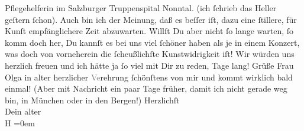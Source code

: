 \begin{ledgroupsized}[t]{13cm}
{{{                  Pflegehelferin im Salzburger Truppenspital
                     Nonntal.}}}\label{K_L02204_1h} (ich ſchrieb das Heller geſtern ſchon). Auch bin ich der Meinung, daß es beſſer iſt, dazu
               eine ſtillere, für Kunſt empfänglichere Zeit abzuwarten. Willſt Du aber nicht ſo
               lange warten, ſo komm doch her, Du kannſt es bei uns viel ſchöner haben als je in
               einem Konzert, was doch von vorneherein die ſcheußlichſte Kunstwidrigkeit iſt! Wir
               würden uns herzlich freuen und ich hätte ja ſo viel mit Dir zu reden, Tage lang!\pend
           \pstart
           Grüße Frau Olga in alter herzlicher
                  \textcolor{gray}{Ve}rehrung ſchönſtens von mir und kommt wirklich bald einmal!
               (Aber mit Nachricht ein paar Tage früher, damit ich nicht gerade weg bin, in München oder in den Bergen!)\pend
           \pstart
           Herzlichſt{\\[\baselineskip]}Dein alter{\\[\baselineskip]}\spacefill\mbox{H}\pend
           \leftskip=0em{}\endnumbering{}\end{ledgroupsized}  \newcommand{\dateiname}{L02204}\newcommand{\titel}{Hermann Bahr an Arthur Schnitzler, 10. 2. 1915}\newcommand{\editorInnen}{ Kurt Ifkovits,  Martin Anton Müller}
      